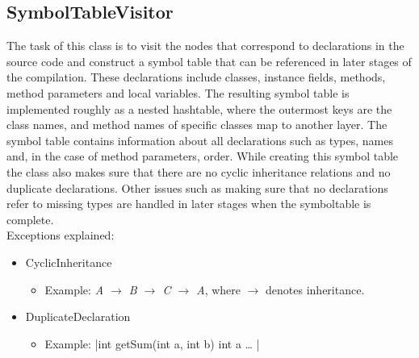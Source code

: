 \documentclass[paper=a4, fontsize=11pt]{scrartcl} %
\numberwithin{equation}{section} %
\numberwithin{figure}{section} %
\numberwithin{table}{section} %
\begin{document}
\subsection{SymbolTableVisitor}
The task of this class is to visit the nodes that correspond to declarations in the source code and construct a symbol table that can be referenced in later stages of the compilation. These declarations include classes, instance fields, methods, method parameters and local variables. The resulting symbol table is implemented roughly as a nested hashtable, where the outermost keys are the class names, and method names of specific classes map to another layer. The symbol table contains information about all declarations such as types, names and, in the case of method parameters, order. While creating this symbol table the class also makes sure that there are no cyclic inheritance relations and no duplicate declarations. Other issues such as making sure that no declarations refer to missing types are handled in later stages when the symboltable is complete.\\

Exceptions explained:
\begin{itemize}
  \item{CyclicInheritance}
  \begin{itemize}
    \item{Example: \emph{A $\rightarrow$ B $\rightarrow$ C $\rightarrow$ A}, where \emph{$\rightarrow$} denotes inheritance.}
  \end{itemize}
  \item{DuplicateDeclaration}
  \begin{itemize}
    \item{Example: |int getSum(int a, int b){ int a … }|}
  \end{itemize}
\end{itemize}
\end{document}
